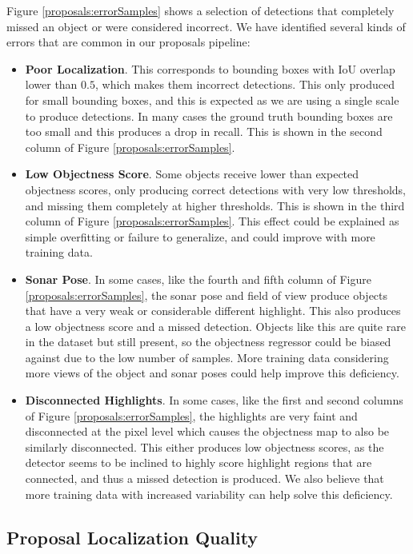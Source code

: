 Figure \ref{proposals:errorSamples} shows a selection of detections that completely missed an object or were considered incorrect. We have identified several kinds of errors that are common in our proposals pipeline:

\begin{itemize}
	\item \textbf{Poor Localization}. This corresponds to bounding boxes with IoU overlap lower than $0.5$, which makes them incorrect detections. This only produced for small bounding boxes, and this is expected as we are using a single scale to produce detections. In many cases the ground truth bounding boxes are too small and this produces a drop in recall. This is shown in the second column of Figure \ref{proposals:errorSamples}.
	\item \textbf{Low Objectness Score}. Some objects receive lower than expected objectness scores, only producing correct detections with very low thresholds, and missing them completely at higher thresholds. This is shown in the third column of Figure \ref{proposals:errorSamples}. This effect could be explained as simple overfitting or failure to generalize, and could improve with more training data.
	\item \textbf{Sonar Pose}. In some cases, like the fourth and fifth column of Figure \ref{proposals:errorSamples}, the sonar pose and field of view produce objects that have a very weak or considerable different highlight. This also produces a low objectness score and a missed detection. Objects like this are quite rare in the dataset but still present, so the objectness regressor could be biased against due to the low number of samples. More training data considering more views of the object and sonar poses could help improve this deficiency.
	\item \textbf{Disconnected Highlights}. In some cases, like the first and second columns of Figure \ref{proposals:errorSamples}, the highlights are very faint and disconnected at the pixel level which causes the objectness map to also be similarly disconnected. This either produces low objectness scores, as the detector seems to be inclined to highly score highlight regions that are connected, and thus a missed detection is produced. We also believe that more training data with increased variability can help solve this deficiency.
\end{itemize}

\subsection{Proposal Localization Quality}

